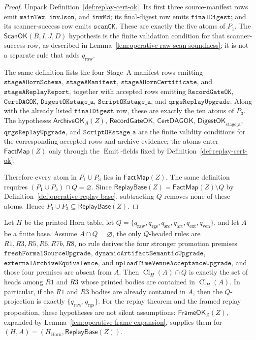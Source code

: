 \documentclass[runningheads]{llncs}
\newcommand{\ScanOK}{\mathsf{ScanOK}}
\newcommand{\RecordGateOK}{\mathsf{RecordGateOK}}
\newcommand{\CertDAGOK}{\mathsf{CertDAGOK}}
\newcommand{\DigestOKstageA}{\mathsf{DigestOK}_{\mathrm{stage\_a}}}
\newcommand{\ArchiveOKA}{\mathsf{ArchiveOK}_{A}}
\newcommand{\FactMap}{\mathsf{FactMap}}
\newcommand{\ReplayBase}{\mathsf{ReplayBase}}
\newcommand{\FrameOKZ}{\mathsf{FrameOK}_{Z}}
\newcommand{\rawBeginTokenCoord}{q_{\mathrm{raw}}}
\newcommand{\qlex}{\rawBeginTokenCoord}
\newcommand{\qrgs}{q_{\mathrm{rgs}}}
\newcommand{\qsrc}{q_{\mathrm{src}}}
\newcommand{\qart}{q_{\mathrm{art}}}
\newcommand{\qext}{q_{\mathrm{ext}}}
\newcommand{\qven}{q_{\mathrm{ven}}}
\newcommand{\HHorn}{H_{\mathrm{Horn}}}
\begin{document}
\begin{proof}
Unpack Definition~\ref{def:replay-cert-ok}.  Its first three source-manifest
rows emit \(\texttt{mainTex}\), \(\texttt{invJson}\), and \(\texttt{invMd}\);
its final-digest row emits \(\texttt{finalDigest}\); and its scanner-success row
emits \(\texttt{scanOK}\).  These are exactly the five atoms of \(P_1\).
The \(\ScanOK(B,I,J,D)\) hypothesis is the finite validation condition for that
scanner-success row, as described in
Lemma~\ref{lem:operative-raw-scan-soundness}; it is not a separate rule that
adds \(\qlex\).

The same definition lists the four Stage--A manifest rows emitting
\(\texttt{stageAHornSchema}\), \(\texttt{stageAManifest}\),
\(\texttt{stageAHornCertificate}\), and
\(\texttt{stageAReplayReport}\), together with accepted rows emitting
\(\texttt{RecordGateOK}\), \(\texttt{CertDAGOK}\),
\(\texttt{DigestOKstage\_a}\), \(\texttt{ScriptOKstage\_a}\), and
\(\texttt{qrgsReplayUpgrade}\).  Along with the already listed
\(\texttt{finalDigest}\) row, these are exactly the ten atoms of \(P_3\).
The hypotheses \(\ArchiveOKA(Z)\), \(\RecordGateOK\), \(\CertDAGOK\),
\(\DigestOKstageA\), \(\texttt{qrgsReplayUpgrade}\), and
\(\texttt{ScriptOKstage\_a}\) are the finite validity conditions for the
corresponding accepted rows and archive evidence; the atoms enter
\(\FactMap(Z)\) only through the \(\operatorname{Emit}\)-fields fixed by
Definition~\ref{def:replay-cert-ok}.

Therefore every atom in \(P_1\cup P_3\) lies in \(\FactMap(Z)\).  The same
definition requires
\((P_1\cup P_3)\cap Q=\varnothing\).  Since
\(\ReplayBase(Z)=\FactMap(Z)\setminus Q\) by
Definition~\ref{def:operative-replay-base}, subtracting \(Q\) removes none of
these atoms.  Hence \(P_1\cup P_3\subseteq\ReplayBase(Z)\).
\end{proof}

\begin{lemma}
\label{lem:operative-closed-world-exactness}
Let \(H\) be the printed Horn table, let
\(Q=\{\qlex,\qrgs,\qsrc,\qart,\qext,\qven\}\), and let \(A\) be a finite base.
Assume \(A\cap Q=\varnothing\), the only \(Q\)-headed rules are
\(R1,R3,R5,R6,R7b,R8\), no rule derives the four stronger promotion premises
\(\texttt{freshFormalSourceUpgrade}\),
\(\texttt{dynamicArtifactSemanticUpgrade}\),
\(\texttt{externalArchiveEquivalence}\), and
\(\texttt{uploadTimeVenueAcceptanceUpgrade}\), and those four premises are
absent from \(A\).  Then \(\operatorname{Cl}_{H}(A)\cap Q\) is exactly the set
of heads among \(R1\) and \(R3\) whose printed bodies are contained in
\(\operatorname{Cl}_{H}(A)\).  In particular, if the \(R1\) and \(R3\) bodies
are already contained in \(A\), then the \(Q\)-projection is exactly
\(\{\qlex,\qrgs\}\).
For the replay theorem and the framed replay proposition, these hypotheses are
not silent assumptions: \(\FrameOKZ(Z)\), expanded by
Lemma~\ref{lem:operative-frame-expansion}, supplies them for
\((H,A)=(\HHorn,\ReplayBase(Z))\).
\end{lemma}
\end{document}
